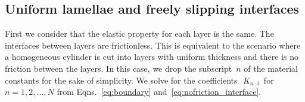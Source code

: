 \documentclass[preprint,12pt,times]{elsarticle}
\newcommand{\minus}[1]{\check{#1}}
\newcommand{\minusminus}[1]{\minus{\minus{#1}}}
\numberwithin{equation}{section}
\newcommand{\pr}[1]{\left( #1 \right)}
\newcommand{\p}{\,\textsf{\small pow}}
\newcommand{\Ksub}[2]{\,K_{ {#1}\cdot {\scriptscriptstyle #2}}\,}
\renewcommand{\>}{$\Rightarrow$}
\begin{document}
\subsection{Uniform lamellae and freely slipping interfaces}
\label{sec:1mat_no_friction}

First we consider that the elastic property for each layer is the same. The interfaces between layers are frictionless. This is equivalent to the scenario where a homogeneous cylinder is cut into layers with uniform thickness and there is no friction between the layers. In this case, we drop the subscript~$n$ of the material constants for the sake of simplicity.
We solve for the coefficients~$\Ksub{n}{i}$ for~$n = 1,2,\dots,N$ from Eqns.~\eqref{eq:boundary} and~\eqref{eq:nofriction_interface}.
\end{document}

